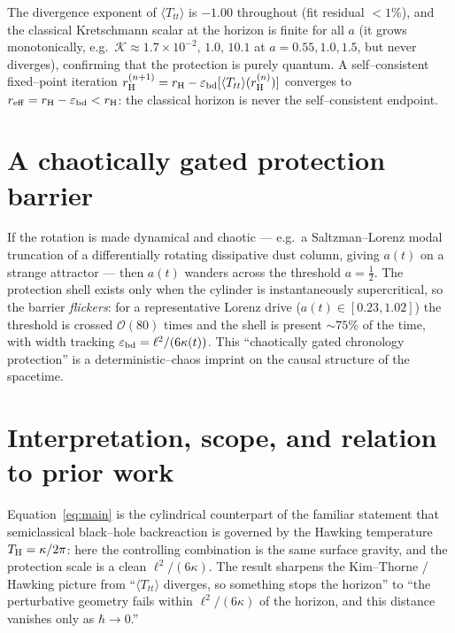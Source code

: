 \documentclass[11pt]{article}
\newcommand{\Ttt}{\langle T_{tt}\rangle}
\newcommand{\rH}{r_{\rm H}}
\newcommand{\ebd}{\varepsilon_{\rm bd}}
\begin{document}
The divergence exponent of $\Ttt$ is $-1.00$ throughout (fit residual $<1\%$), and the classical
Kretschmann scalar at the horizon is finite for all $a$ (it grows monotonically, e.g.\
$\mathcal{K}\approx1.7\times10^{-2},\,1.0,\,10.1$ at $a=0.55,1.0,1.5$, but never diverges),
confirming that the protection is purely quantum. A self--consistent fixed--point iteration
$\rH^{(n+1)}=\rH-\ebd[\Ttt(\rH^{(n)})]$ converges to $r_{\rm eff}=\rH-\ebd<\rH$: the classical
horizon is never the self--consistent endpoint.

\section{A chaotically gated protection barrier}
If the rotation is made dynamical and chaotic --- e.g.\ a Saltzman--Lorenz modal truncation of a
differentially rotating dissipative dust column, giving $a(t)$ on a strange attractor --- then
$a(t)$ wanders across the threshold $a=\tfrac12$. The protection shell exists only when the
cylinder is instantaneously supercritical, so the barrier \emph{flickers}: for a representative
Lorenz drive ($a(t)\in[0.23,1.02]$) the threshold is crossed $\mathcal{O}(80)$ times and the
shell is present $\sim75\%$ of the time, with width tracking $\ebd=\ell^{2}/(6\kappa(t))$. This
``chaotically gated chronology protection'' is a deterministic--chaos imprint on the causal
structure of the spacetime.

\section{Interpretation, scope, and relation to prior work}
Equation~\eqref{eq:main} is the cylindrical counterpart of the familiar statement that
semiclassical black--hole backreaction is governed by the Hawking temperature $T_{\rm H}=\kappa/2\pi$:
here the controlling combination is the same surface gravity, and the protection scale is a clean
$\ell^{2}/(6\kappa)$. The result sharpens the Kim--Thorne / Hawking picture
\cite{KimThorne1991,Hawking1992,Visser2003} from ``$\Ttt$ diverges, so something stops the
horizon'' to ``the perturbative geometry fails within $\ell^{2}/(6\kappa)$ of the horizon, and
this distance vanishes only as $\hbar\to0$.''
\end{document}
